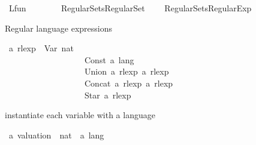 %
\begin{isabellebody}%
%
%
\isadelimtheory
%
\endisadelimtheory
%
\isatagtheory
{}\isamarkupfalse%
\ Lfun\isanewline
\ \ \ \isanewline
\ \ \ \ {\isachardoublequoteopen}Regular{\isacharminus}{\kern0pt}Sets{\isachardot}{\kern0pt}Regular{\isacharunderscore}{\kern0pt}Set{\isachardoublequoteclose}\isanewline
\ \ \ \ {\isachardoublequoteopen}Regular{\isacharminus}{\kern0pt}Sets{\isachardot}{\kern0pt}Regular{\isacharunderscore}{\kern0pt}Exp{\isachardoublequoteclose}\isanewline
{}%
\endisatagtheory
{\isafoldtheory}%
%
\isadelimtheory
%
\endisadelimtheory
%
\isadelimdocument
%
\endisadelimdocument
%
\isatagdocument
%
\isamarkuptrue%
%
\endisatagdocument
{\isafolddocument}%
%
\isadelimdocument
%
\endisadelimdocument
%
\begin{isamarkuptext}%
Regular language expressions%
\end{isamarkuptext}\isamarkuptrue%
\isamarkupfalse%
\ {\isacharprime}{\kern0pt}a\ rlexp\ {\isacharequal}{\kern0pt}\ Var\ nat\ \ \ \ \ \ \ \ \ \ \ \ \ \ \ \ \ \ \ \ \ \ \ \ \ \ \isanewline
\ \ \ \ \ \ \ \ \ \ \ \ \ \ \ \ \ \ {\isacharbar}{\kern0pt}\ Const\ {\isachardoublequoteopen}{\isacharprime}{\kern0pt}a\ lang{\isachardoublequoteclose}\ \ \ \ \ \ \ \ \ \ \ \ \ \ \ \ \ \ \isanewline
\ \ \ \ \ \ \ \ \ \ \ \ \ \ \ \ \ \ {\isacharbar}{\kern0pt}\ Union\ {\isachardoublequoteopen}{\isacharprime}{\kern0pt}a\ rlexp{\isachardoublequoteclose}\ {\isachardoublequoteopen}{\isacharprime}{\kern0pt}a\ rlexp{\isachardoublequoteclose}\isanewline
\ \ \ \ \ \ \ \ \ \ \ \ \ \ \ \ \ \ {\isacharbar}{\kern0pt}\ Concat\ {\isachardoublequoteopen}{\isacharprime}{\kern0pt}a\ rlexp{\isachardoublequoteclose}\ {\isachardoublequoteopen}{\isacharprime}{\kern0pt}a\ rlexp{\isachardoublequoteclose}\ \ \ \ \ \isanewline
\ \ \ \ \ \ \ \ \ \ \ \ \ \ \ \ \ \ {\isacharbar}{\kern0pt}\ Star\ {\isachardoublequoteopen}{\isacharprime}{\kern0pt}a\ rlexp{\isachardoublequoteclose}%
\begin{isamarkuptext}%
instantiate each variable with a language%
\end{isamarkuptext}\isamarkuptrue%
\isamarkupfalse%
\ {\isacharprime}{\kern0pt}a\ valuation\ {\isacharequal}{\kern0pt}\ {\isachardoublequoteopen}nat\ {\isasymRightarrow}\ {\isacharprime}{\kern0pt}a\ lang{\isachardoublequoteclose}%
\begin{isamarkuptext}%

\end{isamarkuptext}
\end{isabellebody}
